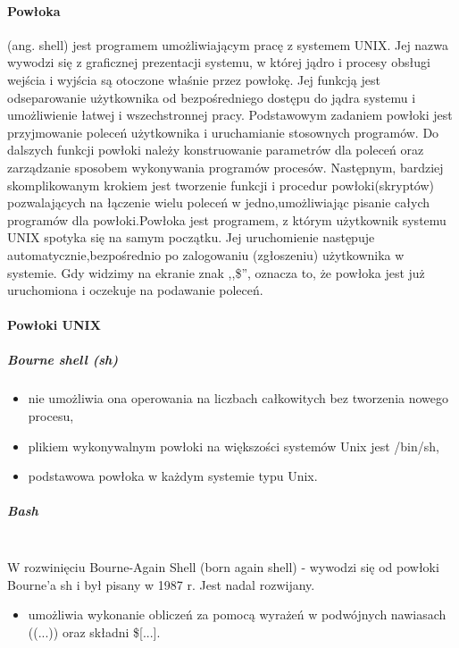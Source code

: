 \documentclass[a4paper,twoside]{report}
\begin{document}
\paragraph{Powłoka} (ang. shell) jest programem umożliwiającym pracę z systemem   UNIX. Jej nazwa wywodzi się z graficznej prezentacji systemu, w której jądro i procesy obsługi wejścia i wyjścia są otoczone właśnie przez powłokę. Jej funkcją jest odseparowanie użytkownika od bezpośredniego dostępu do jądra systemu i umożliwienie   łatwej i wszechstronnej pracy. Podstawowym zadaniem powłoki jest przyjmowanie     poleceń użytkownika i uruchamianie stosownych programów. Do dalszych funkcji powłoki należy konstruowanie parametrów dla poleceń oraz zarządzanie sposobem wykonywania programów procesów. Następnym, bardziej skomplikowanym krokiem jest tworzenie   funkcji i procedur powłoki(skryptów) pozwalających   na łączenie wielu   poleceń  w   jedno,umożliwiając pisanie całych programów dla powłoki.Powłoka jest programem, z którym użytkownik systemu UNIX spotyka się na samym początku. Jej uruchomienie   następuje   automatycznie,bezpośrednio po zalogowaniu (zgłoszeniu) użytkownika w systemie. Gdy widzimy na ekranie znak ,,\$'',   oznacza   to,  że   powłoka   jest   już uruchomiona i oczekuje na podawanie poleceń. 

\paragraph{Powłoki UNIX}

\subparagraph{Bourne shell (sh)}

\begin{itemize}
\item nie umożliwia ona operowania na liczbach całkowitych bez tworzenia nowego procesu,
\item plikiem wykonywalnym powłoki na większości systemów Unix jest /bin/sh,
\item  podstawowa powłoka w każdym systemie typu Unix.
\end{itemize}

\subparagraph{Bash\\\\}
W rozwinięciu Bourne-Again Shell (born again shell) - wywodzi się od powłoki Bourne'a sh i był pisany w 1987 r. Jest nadal rozwijany.
\begin{itemize}
\item umożliwia wykonanie obliczeń za pomocą wyrażeń w podwójnych nawiasach ((...)) oraz składni \$[...].
\end{itemize}
\end{document}

